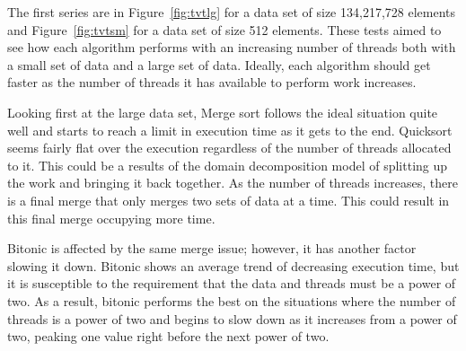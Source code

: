 \documentclass[journal]{IEEEtran}
\begin{document}
The first series are in Figure~\ref{fig:tvtlg} for a data set of size 134,217,728 elements and Figure~\ref{fig:tvtsm} for a data set of size 512 elements. These tests aimed to see how each algorithm performs with an increasing number of threads both with a small set of data and a large set of data. Ideally, each algorithm should get faster as the number of threads it has available to perform work increases.

Looking first at the large data set, Merge sort follows the ideal situation quite well and starts to reach a limit in execution time as it gets to the end. Quicksort seems fairly flat over the execution regardless of the number of threads allocated to it. This could be a results of the domain decomposition model of splitting up the work and bringing it back together. As the number of threads increases, there is a final merge that only merges two sets of data at a time. This could result in this final merge occupying more time. 

Bitonic is affected by the same merge issue; however, it has another factor slowing it down. Bitonic shows an average trend of decreasing execution time, but it is susceptible to the requirement that the data and threads must be a power of two. As a result, bitonic performs the best on the situations where the number of threads is a power of two and begins to slow down as it increases from a power of two, peaking one value right before the next power of two.  

\begin{figure*}[!t]
  \centering
  \caption{Time vs Threads Large Data (Size = 134217728)}
  \label{fig:tvtlg}
\end{figure*}
\end{document}
